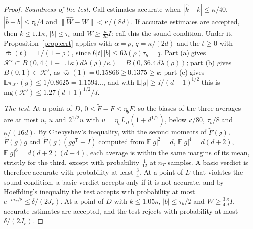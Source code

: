 \documentclass[11pt]{amsart}
\theoremstyle{definition}
\numberwithin{equation}{section}
\newcommand{\E}{\mathbb{E}}
\newcommand{\cK}{\mathcal{K}}
\begin{document}
\begin{proof}
\emph{Soundness of the test.} Call estimates accurate when $|\hat k-k|\le\kappa/40$, $|\hat b-b|\le\tau_b/4$ and $\|\hat W-W\|<\kappa/(8d)$. If accurate estimates are accepted, then $k\le1.1\kappa$, $|b|\le\tau_b$ and $W\ge\frac\kappa{2d}I$: call this the sound condition. Under it, Proposition~\ref{prop:cert} applies with $\alpha=\rho$, $q=\kappa/(2d)$ and the $t\ge0$ with $\bar\varpi(t)=1/(1+\rho)$, since $6|t|\,|b|\le6\lambda(\rho)\tau_b=q$. Part (a) gives $\cK'\subset B(0,4(1+1.1\kappa)d\lambda(\rho)/\kappa)=B(0,36.4\,d\lambda(\rho))$; part (b) gives $B(0,1)\subset\cK'$, as $\bar\varpi(1)=0.15866\ge0.1375\ge k$; part (c) gives $\E\pi_{\cK'}(g)\le1/0.8625=1.1594\ldots$, and with $\E|g|\ge d/(d+1)^{1/2}$ this is $\mathrm{mg}(\cK')\le1.27(d+1)^{1/2}/d$.

\emph{The test.} At a point of $D$, $0\le\tilde F-F\le\eta_bF$, so the biases of the three averages are at most $u$, $u$ and $2^{1/2}u$ with $u=\eta_bL_D(1+d^{1/2})$, below $\kappa/80$, $\tau_b/8$ and $\kappa/(16d)$. By Chebyshev's inequality, with the second moments of $\tilde F(g)$, $\tilde F(g)g$ and $\tilde F(g)(gg^{\mathsf T}-I)$ computed from $\E|g|^2=d$, $\E|g|^4=d(d+2)$, $\E|g|^6=d(d+2)(d+4)$, each average is within the same margins of its mean, strictly for the third, except with probability $\frac1{12}$ at $n_T$ samples. A basic verdict is therefore accurate with probability at least $\frac34$. At a point of $D$ that violates the sound condition, a basic verdict accepts only if it is not accurate, and by Hoeffding's inequality the test accepts with probability at most $e^{-m_T/8}\le\delta/(2J_r)$. At a point of $D$ with $k\le1.05\kappa$, $|b|\le\tau_b/2$ and $W\ge\frac34\frac\kappa dI$, accurate estimates are accepted, and the test rejects with probability at most $\delta/(2J_r)$.


\end{proof}
\end{document}
